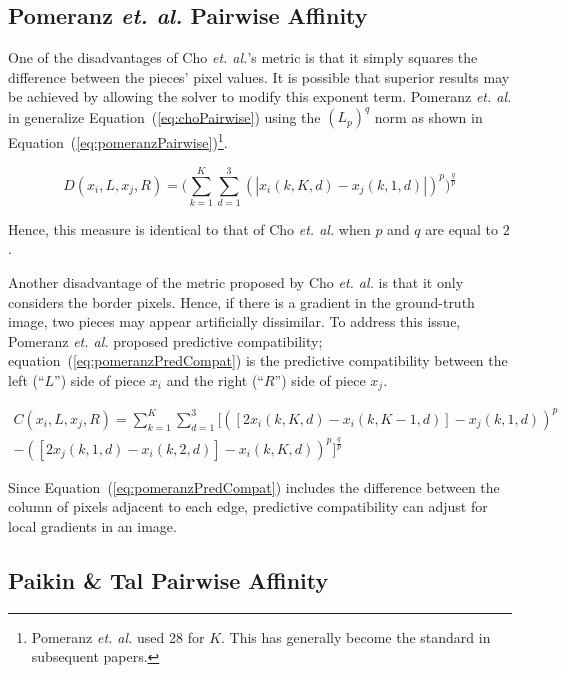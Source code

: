 \documentclass{report}
\def\eref#1{(\ref{#1})}
\begin{document}
\subsection{Pomeranz \textit{et. al.} Pairwise Affinity}\label{sec:pomeranzPairwiseAffinity}

One of the disadvantages of Cho \textit{et. al.}'s metric is that it simply squares the difference between the pieces' pixel values.  It is possible that superior results may be achieved by allowing the solver to modify this exponent term.  Pomeranz \textit{et. al.} in \cite{pomeranz2011} generalize Equation~\eref{eq:choPairwise} using the $(L_p)^q$ norm as shown in Equation~\eref{eq:pomeranzPairwise}\footnote{Pomeranz \textit{et. al.} used 28 for $K$.  This has generally become the standard in subsequent papers.}.

\begin{equation} \label{eq:pomeranzPairwise}
D(x_i,L,x_j,R) = \bigg(\sum_{k=1}^{K}\sum_{d=1}^{3}(|x_i(k,K,d) - x_j(k,1,d)|)^p\bigg)^{\frac{q}{p}}
\end{equation}

Hence, this measure is identical to that of Cho \textit{et. al.} when $p$ and $q$ are equal to $2$.

Another disadvantage of the metric proposed by Cho \textit{et. al.} is that it only considers the border pixels.  Hence, if there is a gradient in the ground-truth image, two pieces may appear artificially dissimilar.  To address this issue, Pomeranz \textit{et. al.} proposed predictive compatibility; equation~\eref{eq:pomeranzPredCompat} is the predictive compatibility between the left (``$L$'') side of piece $x_i$ and the right (``$R$'') side of piece $x_j$.  

\begin{equation} \label{eq:pomeranzPredCompat}
\begin{split}
C(x_i,L,x_j,R) = \sum_{k=1}^{K}\sum_{d=1}^{3}\Big[ ([2x_i(k, K, d) - x_i(k, K-1, d)] - x_j(k, 1, d))^p \\ - ([2x_j(k, 1, d) - x_i(k, 2, d)] - x_i(k, K, d))^p\Big]^{\frac{q}{p}}
\end{split}
\end{equation}

Since Equation~\eref{eq:pomeranzPredCompat} includes the difference between the column of pixels adjacent to each edge, predictive compatibility can adjust for local gradients in an image.

\subsection{Paikin \& Tal Pairwise Affinity}\label{sec:paikinPairwiseAffinity}
\end{document}
